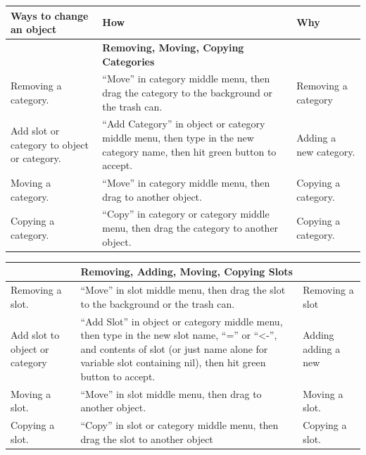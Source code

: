 \documentclass[letterpaper,10pt,english]{sphinxmanual}
\begin{document}
\begin{tabulary}{\linewidth}{p{5cm} p{5cm} p{5cm}}
\hline
\textbf{
Ways to change an object
} & \textbf{
How
} & \textbf{
Why
}\\\hline
 & 
\textbf{Removing, Moving, Copying Categories}
 & \\\hline

Removing a category.
 & 
“Move” in category middle menu, then drag the category to the background or the trash can.
 & 
Removing a category
\\\hline

Add slot or category to object or category.
 & 
“Add Category” in object or category middle menu, then type in the new category name, then hit green button to accept.
 & 
Adding a new category.
\\\hline

Moving a category.
 & 
“Move” in category middle menu, then drag to another object.
 & 
Copying a category.
\\\hline

Copying a category.
 & 
“Copy” in category or category middle menu, then drag the category to another object.
 & 
Copying a category.
\\\hline
\end{tabulary}


\begin{tabulary}{\linewidth}{p{5cm} p{5cm} p{5cm}}
\hline
 & 
\textbf{Removing, Adding, Moving, Copying Slots}
 & \\\hline

Removing a slot.
 & 
“Move” in slot middle menu, then drag the slot to the background or the trash can.
 & 
Removing a slot
\\\hline

Add slot to object or category
 & 
“Add Slot” in object or category middle menu, then type in the new slot name, “=” or “\textless{}-”, and contents of slot (or just name alone for variable slot containing nil), then hit green button to accept.
 & 
Adding adding a new
\\\hline

Moving a slot.
 & 
“Move” in slot middle menu, then drag to another object.
 & 
Moving a slot.
\\\hline

Copying a slot.
 & 
“Copy” in slot or category middle menu, then drag the slot to another object
 & 
Copying a slot.
\\\hline
\end{tabulary}
\end{document}
